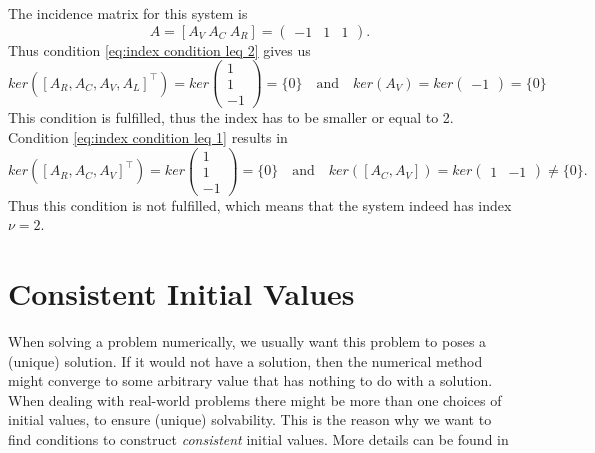 \begin{example3}
	The incidence matrix for this system is
	\begin{displaymath}
		A = [A_V~A_C~A_R] = 
		\left(
		\begin{matrix}
			-1 & 1 & 1
		\end{matrix}
		\right).
	\end{displaymath} 
	Thus condition \eqref{eq:index condition leq 2} gives us
	\begin{displaymath}
		ker([A_R, A_C, A_V, A_L]^\top) = ker
		\left(
		\begin{matrix}
			1 \\
			1 \\ 
			-1
		\end{matrix}
		\right) = \{0\}
		\quad \text{and} \quad 
		ker(A_V) = ker
		\left(
		\begin{matrix}
			-1
		\end{matrix}
		\right) = \{0\}
	\end{displaymath}
	This condition is fulfilled, thus the index has to be smaller or equal to 2.
	Condition \eqref{eq:index condition leq 1} results in
	\begin{displaymath}
		ker([A_R, A_C, A_V]^\top) = ker\left(
		\begin{matrix}
			1 \\
			1 \\
			-1
		\end{matrix}
		\right) = \{0\}
		\quad \text{and} \quad
		ker([A_C, A_V]) = ker
		\left(
		\begin{matrix}
			1 & -1
		\end{matrix}
		\right) \neq \{0\}.
	\end{displaymath}
	Thus this condition is not fulfilled, which means that the system indeed has index $\nu = 2$.
\end{example3}
	
	
\section{Consistent Initial Values}
\label{sec:consistant initial values}

When solving a problem numerically, we usually want this problem to poses a (unique) solution. If it would not have a solution, then the numerical method might converge to some arbitrary value that has nothing to do with a solution. When dealing with real-world problems there might be more than one choices of initial values, to ensure (unique) solvability. This is the reason why we want to find conditions to construct \emph{consistent} initial values. More details can be found in 

